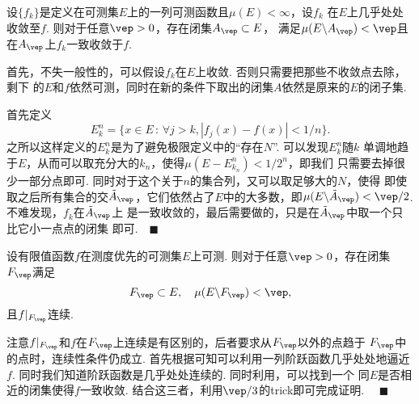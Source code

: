   \begin{thm}[Egorov]
    \label{thm: Egorov}
    设$\{f_k\}$是定义在可测集$E$上的一列可测函数且$\mu(E)<\infty$，设$f_k$
    在$E$上几乎处处收敛至$f$. 则对于任意$\vep>0$，存在闭集$A_\vep\subset E$，
    满足$\mu(E\backslash A_\vep)<\vep$且在$A_\vep$上$f_k$一致收敛于$f$.
  \end{thm}
  \proof
    首先，不失一般性的，可以假设$f_k$在$E$上收敛. 否则只需要把那些不收敛点去除，剩下
    的$E$和$f$依然可测，同时在新的条件下取出的闭集$A$依然是原来的$E$的闭子集.\par
    首先定义
    \[
      E_k^n = \{x\in E\,:\, \forall j > k,
      |f_j(x) - f(x)| < 1/n \}.
    \]
    之所以这样定义的$E_k^n$是为了避免极限定义中的“存在$N$”. 可以发现$E_k^n$随$k$
    单调地趋于$E$，从而可以取充分大的$k_n$，使得$\mu(E-E_{k_n}^n)<1/2^n$，即我们
    只需要去掉很少一部分点即可. 同时对于这个关于$n$的集合列，又可以取足够大的$N$，使得
    即使取之后所有集合的交$\tilde{A}_\vep$，它们依然占了$E$中的大多数，即$\mu(E
    \backslash \tilde{A}_\vep)<\vep/2$. 不难发现，$f_k$在$\tilde{A}_\vep$上
    是一致收敛的，最后需要做的，只是在$\tilde{A}_\vep$中取一个只比它小一点点的闭集
    即可.$\quad\blacksquare$

  \begin{thm}[Lusin]
    设有限值函数$f$在测度优先的可测集$E$上可测. 则对于任意$\vep>0$，存在闭集$F_\vep$满足
    \[
      F_\vep\subset E,\quad \mu(E\backslash F_\vep) < \vep,
    \]
    且$f|_{F_\vep}$连续.
  \end{thm}
  \remark
    注意$f|_{F_\vep}$和$f$在$F_\vep$上连续是有区别的，后者要求从$F_\vep$以外的点趋于
    $F_\vep$中的点时，连续性条件仍成立.
  \proof
    首先根据可知可以利用一列阶跃函数几乎处处地逼近$f$.
    同时我们知道阶跃函数是几乎处处连续的. 同时利用，可以找到一个
    同$E$是否相近的闭集使得$f$一致收敛. 结合这三者，利用$\vep/3$的trick即可完成证明.
    $\quad\blacksquare$
  



  



